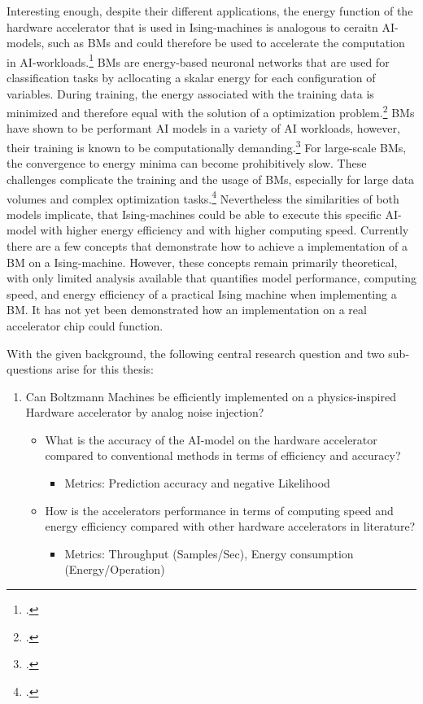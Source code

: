 Interesting enough, despite their different applications, the energy function of the hardware accelerator that is used
in Ising-machines is analogous to ceraitn AI-models, such as \ac{BM}s and could therefore be used to accelerate the computation in AI-workloads.\footcite[cf.][10]{caiHarnessingIntrinsicNoise2019}
\ac{BM}s are energy-based neuronal networks that are used for classification tasks by 
acllocating a skalar energy for each configuration of variables.
During training, the energy associated with the training data is minimized and therefore equal with the solution of a optimization problem.\footcite[cf.][2]{nazmbojnordiMemristiveBoltzmannMachine2016} 
\ac{BM}s have shown to be performant AI models in a variety of AI workloads, however, their training is known to be computationally demanding.\footcite[cf.][1]{nazmbojnordiMemristiveBoltzmannMachine2016} 
For large-scale \ac{BM}s, the convergence to energy minima can become prohibitively slow.
These challenges complicate the training and the usage of \ac{BM}s, especially for large data volumes and complex optimization tasks.\footcite[cf.][2]{nazmbojnordiMemristiveBoltzmannMachine2016} 
Nevertheless the similarities of both models implicate, that Ising-machines could be able to execute this 
specific AI-model with higher energy efficiency and with higher computing speed.
Currently there are a few concepts that demonstrate how to achieve a implementation of a \ac{BM} on a Ising-machine.
However, these concepts remain primarily theoretical, with only limited analysis available that quantifies model performance, computing speed, and energy efficiency of a practical Ising machine when implementing a \ac{BM}.
It has not yet been demonstrated how an implementation on a real accelerator chip could function.

With the given background, the following central research question and two sub-questions arise for this thesis:
\begin{enumerate}
    \item Can Boltzmann Machines be efficiently implemented on a physics-inspired Hardware accelerator by analog noise injection?
        \begin{itemize}
            \item What is the accuracy of the AI-model on the hardware accelerator compared to conventional methods in terms of efficiency and accuracy?
                \begin{itemize}
                    \item Metrics: Prediction accuracy and negative Likelihood
                \end{itemize}
            \item How is the accelerators performance in terms of computing speed and energy efficiency compared with other hardware accelerators in literature?
                \begin{itemize}
                    \item Metrics: Throughput (Samples/Sec), Energy consumption (Energy/Operation)
                \end{itemize}
        \end{itemize}  
\end{enumerate}

